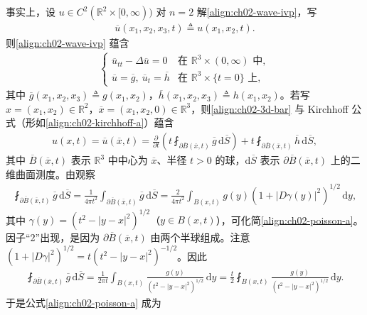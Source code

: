 \documentclass[../../main.tex]{subfiles}
\begin{document}
事实上，设 $u\in C^2(\mathbb{R}^2\times[0,\infty))$ 对 $n=2$ 解\eqref{align:ch02-wave-ivp}，写
\begin{align}\label{align:ch02-descent-2to3}
\overline{u}(x_1,x_2,x_3,t)\triangleq u(x_1,x_2,t).
\end{align}
则\eqref{align:ch02-wave-ivp} 蕴含
\begin{align}\label{align:ch02-3d-bar}
\begin{cases}
\overline{u}_{tt}-\Delta\overline{u}=0 & \text{在 }\mathbb{R}^3\times(0,\infty)\text{ 中},\\
\overline{u}=\overline{g},\ \overline{u}_t=\overline{h} & \text{在 }\mathbb{R}^3\times\{t=0\}\text{ 上},
\end{cases}
\end{align}
其中 $\overline{g}(x_1,x_2,x_3)\triangleq g(x_1,x_2)$，$\overline{h}(x_1,x_2,x_3)\triangleq h(x_1,x_2)$。若写 $x=(x_1,x_2)\in\mathbb{R}^2$，$\overline{x}=(x_1,x_2,0)\in\mathbb{R}^3$，则\eqref{align:ch02-3d-bar} 与 Kirchhoff 公式（形如\eqref{align:ch02-kirchhoff-a}）蕴含
\begin{align}\label{align:ch02-poisson-a}
u(x,t)=\overline{u}(\overline{x},t)=\frac{\partial}{\partial t}\left(t\fint_{\partial\overline{B}(\overline{x},t)}\overline{g}\,\mathrm{d}\overline{S}\right)+t\fint_{\partial\overline{B}(\overline{x},t)}\overline{h}\,\mathrm{d}\overline{S},
\end{align}
其中 $\overline{B}(\overline{x},t)$ 表示 $\mathbb{R}^3$ 中中心为 $\overline{x}$、半径 $t>0$ 的球，$\mathrm{d}\overline{S}$ 表示 $\partial\overline{B}(\overline{x},t)$ 上的二维曲面测度。由观察
\begin{align*}
\fint_{\partial\overline{B}(\overline{x},t)}\overline{g}\,\mathrm{d}\overline{S}
=\frac{1}{4\pi t^2}\int_{\partial\overline{B}(\overline{x},t)}\overline{g}\,\mathrm{d}\overline{S}
=\frac{2}{4\pi t^2}\int_{B(x,t)}g(y)(1+|D\gamma(y)|^2)^{1/2}\,\mathrm{d}y,
\end{align*}
其中 $\gamma(y)=(t^2-|y-x|^2)^{1/2}$（$y\in B(x,t)$），可化简\eqref{align:ch02-poisson-a}。因子``2''出现，是因为 $\partial\overline{B}(\overline{x},t)$ 由两个半球组成。注意 $(1+|D\gamma|^2)^{1/2}=t(t^2-|y-x|^2)^{-1/2}$。因此
\begin{align*}
\fint_{\partial\overline{B}(\overline{x},t)}\overline{g}\,\mathrm{d}\overline{S}
=\frac{1}{2\pi t}\int_{B(x,t)}\frac{g(y)}{(t^2-|y-x|^2)^{1/2}}\,\mathrm{d}y
=\frac{t}{2}\fint_{B(x,t)}\frac{g(y)}{(t^2-|y-x|^2)^{1/2}}\,\mathrm{d}y.
\end{align*}
于是公式\eqref{align:ch02-poisson-a} 成为
\end{document}
